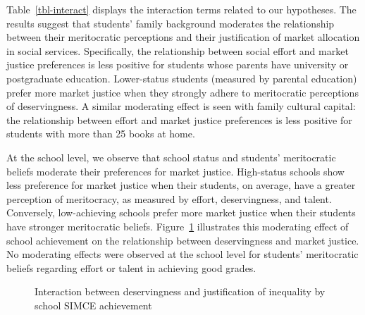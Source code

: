 \documentclass[
    behavsci,
    article,
    submit,
moreauthors
]{mdpi}
\begin{document}
Table~\ref{tbl-interact} displays the interaction terms related to our
hypotheses. The results suggest that students' family background
moderates the relationship between their meritocratic perceptions and
their justification of market allocation in social services.
Specifically, the relationship between social effort and market justice
preferences is less positive for students whose parents have university
or postgraduate education. Lower-status students (measured by parental
education) prefer more market justice when they strongly adhere to
meritocratic perceptions of deservingness. A similar moderating effect
is seen with family cultural capital: the relationship between effort
and market justice preferences is less positive for students with more
than 25 books at home.

At the school level, we observe that school status and students'
meritocratic beliefs moderate their preferences for market justice.
High-status schools show less preference for market justice when their
students, on average, have a greater perception of meritocracy, as
measured by effort, deservingness, and talent. Conversely, low-achieving
schools prefer more market justice when their students have stronger
meritocratic beliefs. Figure~\ref{fig-interaction} illustrates this
moderating effect of school achievement on the relationship between
deservingness and market justice. No moderating effects were observed at
the school level for students' meritocratic beliefs regarding effort or
talent in achieving good grades.

\begin{figure}


\caption{\label{fig-interaction}Interaction between deservingness and
justification of inequality by school SIMCE achievement}

\end{figure}%
\end{document}
